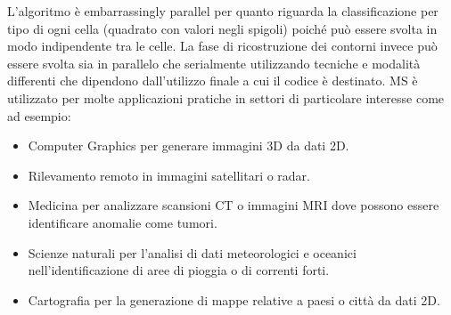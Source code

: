 \documentclass[12pt,a4paper]{report}
\begin{document}
L'algoritmo è embarrassingly parallel per quanto riguarda la classificazione per tipo di ogni cella (quadrato con valori negli spigoli) poiché può essere svolta in modo indipendente tra le celle. \newline
La fase di ricostruzione dei contorni invece può essere svolta sia in parallelo che serialmente utilizzando tecniche e modalità differenti che dipendono dall'utilizzo finale a cui il codice è destinato. \newline
MS è utilizzato per molte applicazioni pratiche in settori di particolare interesse come ad esempio:
\begin{itemize}
\item Computer Graphics per generare immagini 3D da dati 2D.
\item Rilevamento remoto in immagini satellitari o radar.
\item Medicina per analizzare scansioni CT o immagini MRI dove possono essere identificare anomalie come tumori.
\item Scienze naturali per l'analisi di dati meteorologici e oceanici nell'identificazione di aree di pioggia o di correnti forti.
\item Cartografia per la generazione di mappe relative a paesi o città da dati 2D.
\end{itemize}
\end{document}
